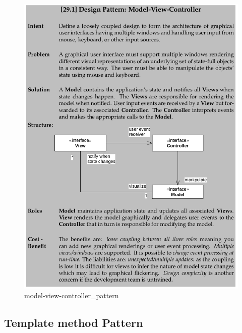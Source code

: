 \documentclass[11pt]{article}
\makeatletter
\def\maxwidth{\ifdim\Gin@nat@width>\linewidth\linewidth
    \else\Gin@nat@width\fi}
\let\Oldincludegraphics\includegraphics
\renewcommand{\includegraphics}[1]{\Oldincludegraphics[width=.8\maxwidth]{#1}}
\makeatother
\begin{document}
\begin{figure}
\centering
\includegraphics{img/model-view-controller_pattern.png}
\caption{model-view-controller\_pattern}
\end{figure}

\hypertarget{template-method-pattern}{%
\subsection{Template method Pattern}\label{template-method-pattern}}
\end{document}
